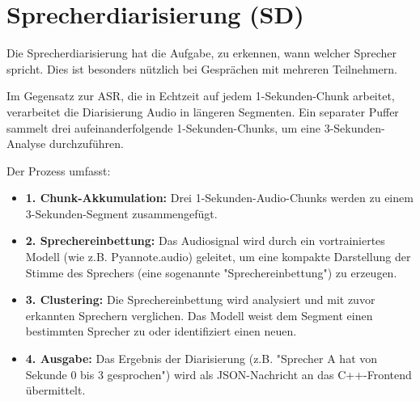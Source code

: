 \section{Sprecherdiarisierung (SD)}

Die Sprecherdiarisierung hat die Aufgabe, zu erkennen, wann welcher Sprecher spricht. Dies ist besonders nützlich bei Gesprächen mit mehreren Teilnehmern.

Im Gegensatz zur ASR, die in Echtzeit auf jedem 1-Sekunden-Chunk arbeitet, verarbeitet die Diarisierung Audio in längeren Segmenten. Ein separater Puffer sammelt drei aufeinanderfolgende 1-Sekunden-Chunks, um eine 3-Sekunden-Analyse durchzuführen.

Der Prozess umfasst:
\begin{itemize}
\item \textbf{1. Chunk-Akkumulation:} Drei 1-Sekunden-Audio-Chunks werden zu einem 3-Sekunden-Segment zusammengefügt.
\item \textbf{2. Sprechereinbettung:} Das Audiosignal wird durch ein vortrainiertes Modell (wie z.B. Pyannote.audio) geleitet, um eine kompakte Darstellung der Stimme des Sprechers (eine sogenannte "Sprechereinbettung") zu erzeugen.
\item \textbf{3. Clustering:} Die Sprechereinbettung wird analysiert und mit zuvor erkannten Sprechern verglichen. Das Modell weist dem Segment einen bestimmten Sprecher zu oder identifiziert einen neuen.
\item \textbf{4. Ausgabe:} Das Ergebnis der Diarisierung (z.B. "Sprecher A hat von Sekunde 0 bis 3 gesprochen") wird als JSON-Nachricht an das C++-Frontend übermittelt.
\end{itemize}